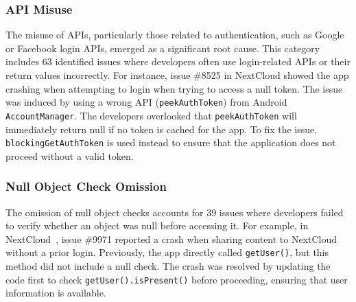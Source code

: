 \subsubsection{API Misuse}
The misuse of APIs, particularly those related to authentication, such as Google or Facebook login APIs, emerged as a significant root cause. This category includes 63 identified issues where developers often use login-related APIs or their return values incorrectly.
For instance, issue \#8525 in NextCloud showed the app crashing when attempting to login when trying to access a null token.
The issue was induced by using a wrong API (\texttt{peekAuthToken}) from Android \texttt{AccountManager}.
The developers overlooked that \texttt{peekAuthToken} will immediately return null if no token is cached for the app.
To fix the issue, \texttt{blockingGetAuthToken} is used instead to ensure that the application does not proceed without a valid token.

\subsubsection{Null Object Check Omission}
The omission of null object checks accounts for 39 issues where developers failed to verify whether an object was null before accessing it. For example, in NextCloud~\cite{nextcloud-android}, issue \#9971 reported a crash when sharing content to NextCloud without a prior login. Previously, the app directly called \texttt{getUser()}, but this method did not include a null check. The crash was resolved by updating the code first to check \texttt{getUser().isPresent()} before proceeding, ensuring that user information is available.


